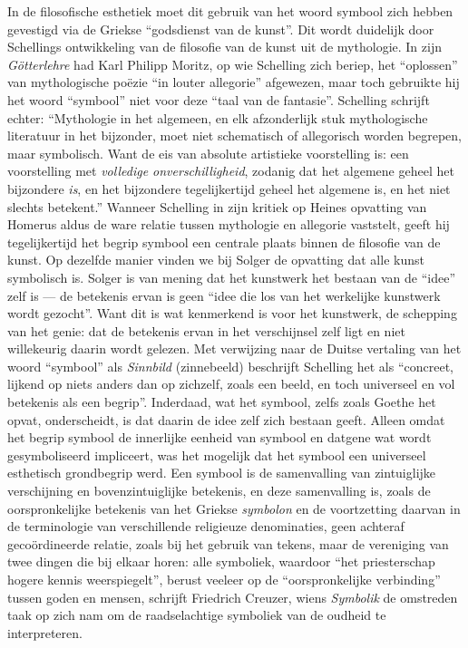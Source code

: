 In de filosofische esthetiek moet dit gebruik van het woord symbool zich hebben gevestigd via de Griekse ``godsdienst van de kunst''. Dit wordt duidelijk door Schellings ontwikkeling van de filosofie van de kunst uit de mythologie. In zijn \textit{Götterlehre} had Karl Philipp Moritz, op wie Schelling zich beriep, het ``oplossen'' van mythologische poëzie ``in louter allegorie'' afgewezen, maar toch gebruikte hij het woord ``symbool'' niet voor deze ``taal van de fantasie''. Schelling schrijft echter: ``Mythologie in het algemeen, en elk afzonderlijk stuk mythologische literatuur in het bijzonder, moet niet schematisch of allegorisch worden begrepen, maar symbolisch. Want de eis van absolute artistieke voorstelling is: een voorstelling met \textit{volledige onverschilligheid}, zodanig dat het algemene geheel het bijzondere \textit{is}, en het bijzondere tegelijkertijd geheel het algemene is, en het niet slechts betekent.''  Wanneer Schelling in zijn kritiek op Heines opvatting van Homerus aldus de ware relatie tussen mythologie en allegorie vaststelt, geeft hij tegelijkertijd het begrip symbool een centrale plaats binnen de filosofie van de kunst. Op dezelfde manier vinden we bij Solger de opvatting dat alle kunst symbolisch is. Solger is van mening dat het kunstwerk het bestaan van de ``idee'' zelf is — de betekenis ervan is geen ``idee die los van het werkelijke kunstwerk wordt gezocht''. Want dit is wat kenmerkend is voor het kunstwerk, de schepping van het genie: dat de betekenis ervan in het verschijnsel zelf ligt en niet willekeurig daarin wordt gelezen. Met verwijzing naar de Duitse vertaling van het woord ``symbool'' als \textit{Sinnbild} (zinnebeeld) beschrijft Schelling het als ``concreet, lijkend op niets anders dan op zichzelf, zoals een beeld, en toch universeel en vol betekenis als een begrip''. Inderdaad, wat het symbool, zelfs zoals Goethe het opvat, onderscheidt, is dat daarin de idee zelf zich bestaan geeft. Alleen omdat het begrip symbool de innerlijke eenheid van symbool en datgene wat wordt gesymboliseerd impliceert, was het mogelijk dat het symbool een universeel esthetisch grondbegrip werd. Een symbool is de samenvalling van zintuiglijke verschijning en bovenzintuiglijke betekenis, en deze samenvalling is, zoals de oorspronkelijke betekenis van het Griekse \textit{symbolon} en de voortzetting daarvan in de terminologie van verschillende religieuze denominaties, geen achteraf gecoördineerde relatie, zoals bij het gebruik van tekens, maar de vereniging van twee dingen die bij elkaar horen: alle symboliek, waardoor ``het priesterschap hogere kennis weerspiegelt'', berust veeleer op de ``oorspronkelijke verbinding'' tussen goden en mensen, schrijft Friedrich Creuzer, wiens \textit{Symbolik} de omstreden taak op zich nam om de raadselachtige symboliek van de oudheid te interpreteren.

